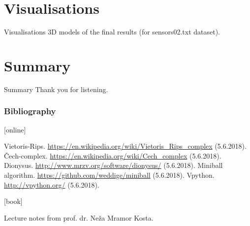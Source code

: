 \documentclass{beamer}
\begin{document}
\section*{Visualisations}

\begin{frame}{Visualisations}
3D models of the final results (for sensors02.txt dataset). 
\end{frame}

\section*{Summary}

\begin{frame}{Summary}
Thank you for listening. 
\end{frame}





\begin{frame}
  \frametitle<presentation>{Bibliography}
    
  \begin{thebibliography}{99}

  [online]
  	 
  Vietoris-Rips. \url{https://en.wikipedia.org/wiki/Vietoris_Rips_complex} (5.6.2018).
  Čech-complex. \url{https://en.wikipedia.org/wiki/Cech_complex} (5.6.2018).
  Dionysus. \url{http://www.mrzv.org/software/dionysus/} (5.6.2018).
  Miniball algorithm. \url{https://github.com/weddige/miniball} (5.6.2018).
  Vpython. \url{http://vpython.org/} (5.6.2018).


  [book]
 	
   Lecture notes from prof. dr. Neža Mramor Kosta.
  \end{thebibliography}
\end{frame}
\end{document}
